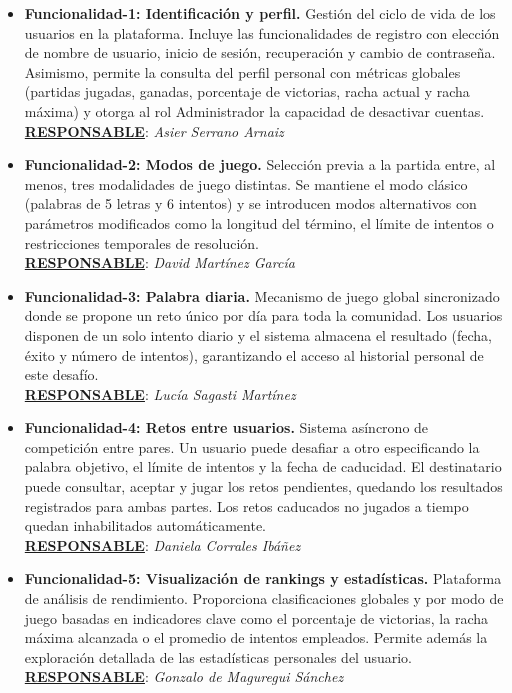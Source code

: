 \documentclass[a4paper,11pt]{article}
\begin{document}
\begin{itemize}
    \item \textbf{Funcionalidad-1: Identificación y perfil.}
    Gestión del ciclo de vida de los usuarios en la plataforma. Incluye las funcionalidades de registro con elección de nombre de usuario, inicio de sesión, recuperación y cambio de contraseña. Asimismo, permite la consulta del perfil personal con métricas globales (partidas jugadas, ganadas, porcentaje de victorias, racha actual y racha máxima) y otorga al rol Administrador la capacidad de desactivar cuentas.\\
    \underline{\textbf{RESPONSABLE}}: \textit{Asier Serrano Arnaiz}\\

    \item \textbf{Funcionalidad-2: Modos de juego.}
    Selección previa a la partida entre, al menos, tres modalidades de juego distintas. Se mantiene el modo clásico (palabras de 5 letras y 6 intentos) y se introducen modos alternativos con parámetros modificados como la longitud del término, el límite de intentos o restricciones temporales de resolución.\\
    \underline{\textbf{RESPONSABLE}}: \textit{David Martínez García
}\\

    \item \textbf{Funcionalidad-3: Palabra diaria.}
    Mecanismo de juego global sincronizado donde se propone un reto único por día para toda la comunidad. Los usuarios disponen de un solo intento diario y el sistema almacena el resultado (fecha, éxito y número de intentos), garantizando el acceso al historial personal de este desafío.\\
    \underline{\textbf{RESPONSABLE}}: \textit{Lucía Sagasti Martínez
}\\

    \item \textbf{Funcionalidad-4: Retos entre usuarios.}
    Sistema asíncrono de competición entre pares. Un usuario puede desafiar a otro especificando la palabra objetivo, el límite de intentos y la fecha de caducidad. El destinatario puede consultar, aceptar y jugar los retos pendientes, quedando los resultados registrados para ambas partes. Los retos caducados no jugados a tiempo quedan inhabilitados automáticamente.\\
    \underline{\textbf{RESPONSABLE}}: \textit{Daniela Corrales Ibáñez
}\\

    \item \textbf{Funcionalidad-5: Visualización de rankings y estadísticas.}
    Plataforma de análisis de rendimiento. Proporciona clasificaciones globales y por modo de juego basadas en indicadores clave como el porcentaje de victorias, la racha máxima alcanzada o el promedio de intentos empleados. Permite además la exploración detallada de las estadísticas personales del usuario.\\
    \underline{\textbf{RESPONSABLE}}: \textit{Gonzalo de Maguregui Sánchez
}\\


\end{itemize}
\end{document}
